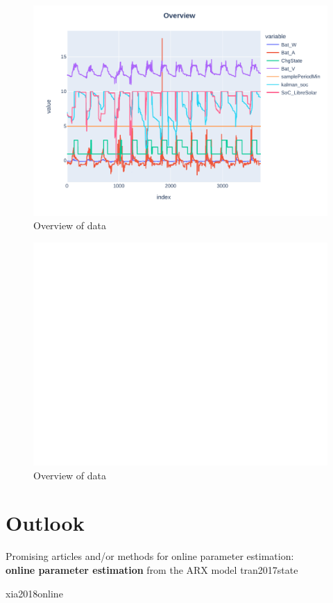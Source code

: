 \begin{figure}[!ht]
\includegraphics{overview}
\caption{\label{fig:overview} Overview of data}
\end{figure}

\begin{figure}[!ht]
\includegraphics{matplotoverview}
\caption{\label{fig:overview} Overview of data}
\end{figure}

\chapter{Outlook}

Promising articles and/or methods for online parameter estimation: \\ 

\textbf{online parameter estimation} from the ARX model {tran2017state}

\cite{wang2021augmented}
{xia2018online}
